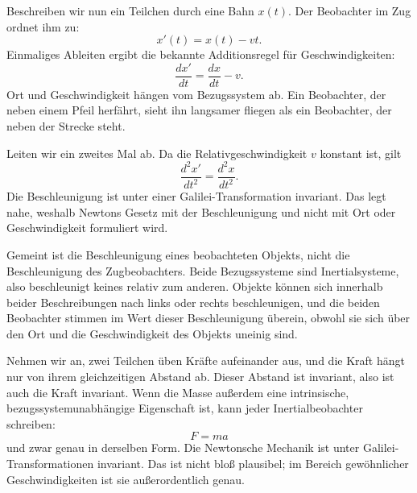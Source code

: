 \begin{classroomqa}
\end{classroomqa}

Beschreiben wir nun ein Teilchen durch eine Bahn \(x(t)\). Der Beobachter im Zug ordnet ihm zu:
\begin{equation}
x'(t)=x(t)-vt.
\end{equation}
Einmaliges Ableiten ergibt die bekannte Additionsregel für Geschwindigkeiten:
\begin{equation}
\frac{dx'}{dt}=\frac{dx}{dt}-v.
\end{equation}
Ort und Geschwindigkeit hängen vom Bezugssystem ab. Ein Beobachter, der neben einem Pfeil herfährt, sieht ihn langsamer fliegen als ein Beobachter, der neben der Strecke steht.

Leiten wir ein zweites Mal ab. Da die Relativgeschwindigkeit \(v\) konstant ist, gilt
\begin{equation}
\frac{d^2x'}{dt^2}=\frac{d^2x}{dt^2}.
\end{equation}
Die Beschleunigung ist unter einer Galilei-Transformation invariant. Das legt nahe, weshalb Newtons Gesetz mit der Beschleunigung und nicht mit Ort oder Geschwindigkeit formuliert wird.

Gemeint ist die Beschleunigung eines beobachteten Objekts, nicht die Beschleunigung des Zugbeobachters. Beide Bezugssysteme sind Inertialsysteme, also beschleunigt keines relativ zum anderen. Objekte können sich innerhalb beider Beschreibungen nach links oder rechts beschleunigen, und die beiden Beobachter stimmen im Wert dieser Beschleunigung überein, obwohl sie sich über den Ort und die Geschwindigkeit des Objekts uneinig sind.

Nehmen wir an, zwei Teilchen üben Kräfte aufeinander aus, und die Kraft hängt nur von ihrem gleichzeitigen Abstand ab. Dieser Abstand ist invariant, also ist auch die Kraft invariant. Wenn die Masse außerdem eine intrinsische, bezugssystemunabhängige Eigenschaft ist, kann jeder Inertialbeobachter schreiben:
\begin{equation}
F=ma
\end{equation}
und zwar genau in derselben Form. Die Newtonsche Mechanik ist unter Galilei-Transformationen invariant. Das ist nicht bloß plausibel; im Bereich gewöhnlicher Geschwindigkeiten ist sie außerordentlich genau.

